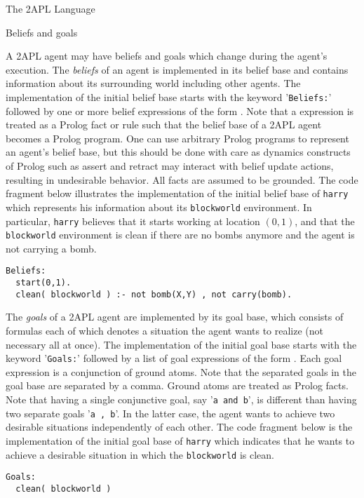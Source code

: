 \begin{chapter}{The 2APL Language}
\begin{section}{Beliefs and goals}

A 2APL agent may have beliefs and goals which change during the
agent's execution. The \emph{beliefs} of an agent is implemented in
its belief base and contains information about its surrounding world
including other agents. The implementation of the initial belief
base starts with the keyword '{\tt Beliefs:}' followed by one or
more belief expressions of the form . Note that a
 expression is treated as a Prolog fact or rule such
that the belief base of a 2APL agent becomes a Prolog program. One
can use arbitrary Prolog programs to represent an agent's belief
base, but this should be done with care as dynamics constructs of
Prolog such as assert and retract may interact with belief update
actions, resulting in undesirable behavior. All facts are assumed to
be grounded. The code fragment below illustrates the implementation
of the initial belief base of {\tt harry} which represents his
information about its {\tt blockworld} environment. In particular,
{\tt harry} believes that it starts working at location $(0,1)$, and
that the {\tt blockworld} environment is clean if there are no bombs
anymore and the agent is not carrying a bomb.

\begin{verbatim}
Beliefs:
  start(0,1).
  clean( blockworld ) :- not bomb(X,Y) , not carry(bomb).
\end{verbatim}

The \emph{goals} of a 2APL agent are implemented by its goal base,
which consists of formulas each of which denotes a situation the
agent wants to realize (not necessary all at once). The
implementation of the initial goal base starts with the keyword
'{\tt Goals:}' followed by a list of goal expressions of the form
. Each goal expression is a conjunction of ground atoms.
Note that the separated goals in the goal base are separated by a
comma. Ground atoms are treated as Prolog facts. Note that having a
single conjunctive goal, say '{\tt a and b}', is different than
having two separate goals '{\tt a , b}'. In the latter case, the
agent wants to achieve two desirable situations independently of
each other. The code fragment below is the implementation of the
initial goal base of {\tt harry} which indicates that he wants to
achieve a desirable situation in which the {\tt blockworld} is
clean.

\begin{verbatim}
Goals:
  clean( blockworld )
\end{verbatim}


\end{section}
\end{chapter}
